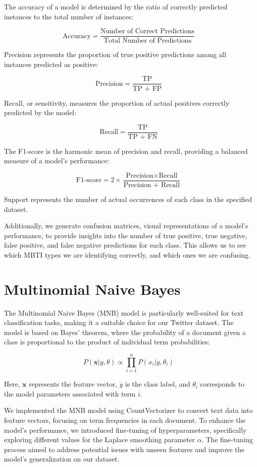 \documentclass[twoside,11pt]{article}
\begin{document}
The accuracy of a model is determined by the ratio of correctly predicted instances to the total number of instances:

\[
\text{Accuracy} = \frac{\text{Number of Correct Predictions}}{\text{Total Number of Predictions}}
\]

Precision represents the proportion of true positive predictions among all instances predicted as positive:

\[
\text{Precision} = \frac{\text{TP}}{\text{TP + FP}}
\]

Recall, or sensitivity, measures the proportion of actual positives correctly predicted by the model:

\[
\text{Recall} = \frac{\text{TP}}{\text{TP + FN}}
\]

The F1-score is the harmonic mean of precision and recall, providing a balanced measure of a model's performance:

\[
\text{F1-score} = 2 \times \frac{\text{Precision} \times \text{Recall}}{\text{Precision + Recall}}
\]

Support represents the number of actual occurrences of each class in the specified dataset.

Additionally, we generate confusion matrices, visual representations of a model's performance, to provide insights into the number of true positive, true negative, false positive, and false negative predictions for each class. This allows us to see which MBTI types we are identifying correctly, and which ones we are confusing.

\section{Multinomial Naive Bayes}
The Multinomial Naive Bayes (MNB) model is particularly well-suited for text classification tasks, making it a suitable choice for our Twitter dataset. The model is based on Bayes' theorem, where the probability of a document given a class is proportional to the product of individual term probabilities:

\[
P(\textbf{x}|y,\theta)\propto\prod_{i=1}^{n}P(x_{i}|y,\theta_{i})
\]

Here, \(\textbf{x}\) represents the feature vector, \(y\) is the class label, and \(\theta_{i}\) corresponds to the model parameters associated with term \(i\).

We implemented the MNB model using CountVectorizer to convert text data into feature vectors, focusing on term frequencies in each document. To enhance the model's performance, we introduced fine-tuning of hyperparameters, specifically exploring different values for the Laplace smoothing parameter \(\alpha\). The fine-tuning process aimed to address potential issues with unseen features and improve the model's generalization on our dataset.
\end{document}
